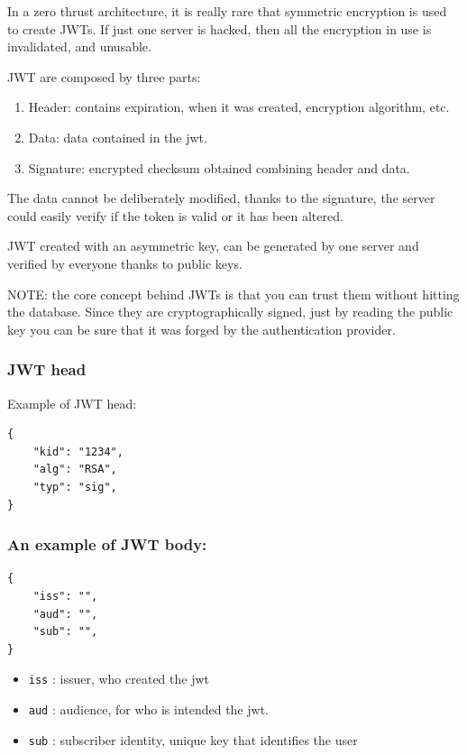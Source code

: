 \documentclass[11pt]{style}
\begin{document}
In a zero thrust architecture, it is really rare that symmetric encryption is
used to create JWTs. If just one server is hacked, then all the encryption in
use is invalidated, and unusable.

JWT are composed by three  parts:

\begin{enumerate}
    \item Header: contains expiration, when it was created, encryption
        algorithm, etc.
    \item Data: data contained in the jwt.
    \item Signature: encrypted checksum obtained combining header and data.
\end{enumerate}

The data cannot be deliberately modified, thanks to the signature, the server
could easily verify if the token is valid or it has been altered.

JWT created with an asymmetric key, can be generated by one server and verified
by everyone thanks to public keys.

NOTE: the core concept behind JWTs is that you can trust them without hitting
the database. Since they are cryptographically signed, just by reading the
public key you can be sure that it was forged by the authentication provider.

\subsubsection{JWT head}
Example of JWT head:
\begin{lstlisting}
{
    "kid": "1234",
    "alg": "RSA",
    "typ": "sig",
}
\end{lstlisting}

\subsubsection{An example of JWT body:}
\begin{lstlisting}
{
    "iss": "",
    "aud": "",
    "sub": "",
}
\end{lstlisting}
\begin{itemize}
    \item \texttt{iss} : issuer, who created the jwt
    \item \texttt{aud} : audience, for who is intended the jwt.
    \item \texttt{sub} : subscriber identity, unique key that identifies the
        user
\end{itemize}
\end{document}
